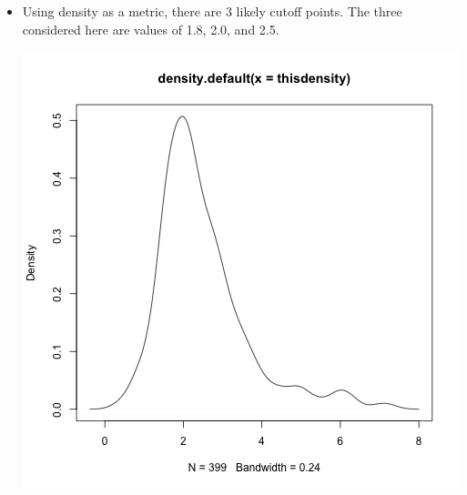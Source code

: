 \documentclass[11pt]{article}
\begin{document}
\begin{enumerate}
\begin{itemize}
\begin{figure}[H]
\begin{center}
{\begin{centering}
\par\end{centering}}
\quad{}
\end{center}
\end{figure}


\item Using density as a metric, there are 3 likely cutoff points. 
The three considered here are values of 1.8, 2.0, and 2.5. 

\begin{center}
\includegraphics[scale=0.35]{density_density}
\end{center}


\end{itemize}
\end{enumerate}
\end{document}
